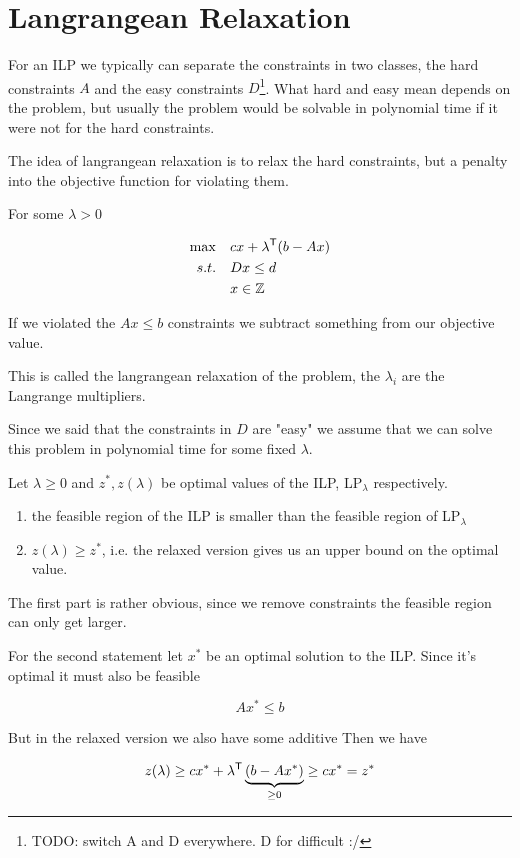 \section{Langrangean Relaxation}

For an ILP we typically can separate the constraints in two classes, the hard constraints $A$ and the easy constraints $D$\footnote{TODO: switch A and D everywhere. D for difficult :/}. What hard and easy mean depends on the problem, but usually the problem would be solvable in polynomial time if it were not for the hard constraints.

The idea of langrangean relaxation is to relax the hard constraints, but  a penalty into the objective function for violating them.

For some $\lambda>0$

\begin{align*}
\max \quad & c x + {\lambda}^\text{\upshape \sffamily T}(b-Ax)\\
s.t. \quad & Dx \leq d\\
	& x\in \mathbb{Z}
\end{align*}

If we violated the $Ax\leq b$ constraints we subtract something from our objective value.

This is called the langrangean relaxation of the problem, the $\lambda_i$ are the Langrange multipliers.

Since we said that the constraints in $D$ are "easy" we assume that we can solve this problem in polynomial time for some fixed $\lambda$.

\begin{thm} Let $\lambda \geq 0$ and $z^*,z(\lambda)$ be optimal values of the ILP, LP$_\lambda$ respectively.

\begin{enumerate}
\item the feasible region of the ILP is smaller than the feasible region of LP$_\lambda$
\item $z(\lambda)\geq z^*$, i.e. the relaxed version gives us an upper bound on the optimal value.
\end{enumerate}
\end{thm}

\begin{pr} The first part is rather obvious, since we remove constraints the feasible region can only get larger.

For the second statement let $x^*$ be an optimal solution to the ILP. Since it's optimal it must also be feasible

\[Ax^*\leq b\]

But in the relaxed version we also have some additive Then we have

\[z(\lambda) \geq cx^* + {\lambda}^\text{\upshape \sffamily T}\underbrace{(b-Ax^*)}_{\geq 0} \geq cx^*=z^*\]
\end{pr}

